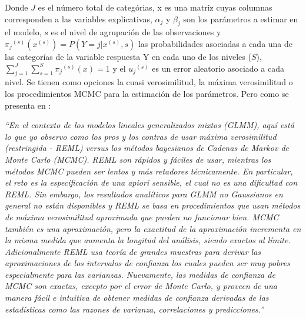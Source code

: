 \documentclass[]{book}
\theoremstyle{definition}
\theoremstyle{definition}
\theoremstyle{definition}
\theoremstyle{remark}
\begin{document}
Donde \(J\) es el número total de categórias, x es una matriz cuyas
columnas corresponden a las variables explicativas, \({ \alpha }_{ j }\)
y \({ \beta }_{ j }\) son los parámetros a estimar en el modelo, \(s\)
es el nivel de agrupación de las observaciones y
\({ { \pi }_{ j } }^{ (s) }({ x }^{ (s) })=P(Y=j|{ x }^{ (s) },s)\) las
probabilidades asociadas a cada una de las categorías de la variable
respuesta Y en cada uno de los niveles (\(S\)),
\(\sum _{ j=1 }^{ J }{ \sum _{ s=1 }^{ S }{ { { \pi }_{ j } }^{ (s) }(x) } } =1\)
y el \({ { u }_{ j } }^{ (s) }\) es un error aleatorio asociado a cada
nivel. Se tienen como opciones la cuasi verosimilitud, la máxima
verosimilitud o los procedimientos MCMC para la estimación de los
parámetros. Pero como se presenta en \citep{HadfieldBook}:

\emph{``En el contexto de los modelos lineales generalizados mixtos
(GLMM), aquí está lo que yo observo como los pros y los contras de usar
máxima verosimilitud (restringida - REML) versus los métodos bayesianos
de Cadenas de Markov de Monte Carlo (MCMC). REML son rápidos y fáciles
de usar, mientras los métodos MCMC pueden ser lentos y más retadores
técnicamente. En particular, el reto es la especificación de una apiori
sensible, el cual no es una dificultad con REML. Sin embargo, los
resultados analíticos para GLMM no Gaussianos en general no están
disponibles y REML se basa en procedimientos que usan métodos de máxima
verosimilitud aproximada que pueden no funcionar bien. MCMC también es
una aproximación, pero la exactitud de la aproximación incrementa en la
misma medida que aumenta la longitud del análisis, siendo exactos al
límite. Adicionalmente REML usa teoría de grandes muestras para derivar
las aproximaciones de los intervalos de confianza los cuales pueden ser
muy pobres especialmente para las varianzas. Nuevamente, las medidas de
confianza de MCMC son exactas, excepto por el error de Monte Carlo, y
proveen de una manera fácil e intuitiva de obtener medidas de confianza
derivadas de las estadísticas como las razones de varianza,
correlaciones y predicciones.''}
\end{document}

